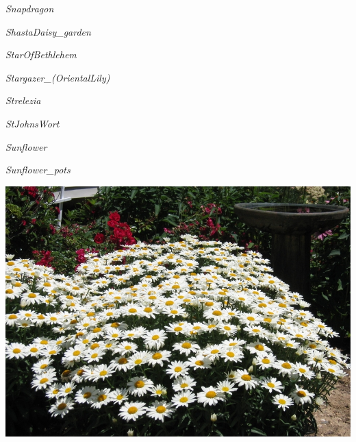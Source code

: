 \documentclass{article}
\begin{document}
\noindent   
\vfill
\centerline{{\Large\emph{Snapdragon}}}
\vfill
\newpage

\noindent   
\vfill
\centerline{{\Large\emph{ShastaDaisy_garden}}}
\vfill
\newpage

\noindent   
\vfill
\centerline{{\Large\emph{StarOfBethlehem}}}
\vfill
\newpage

\noindent   
\vfill
\centerline{{\Large\emph{Stargazer_(OrientalLily)}}}
\vfill
\newpage

\noindent   
\vfill
\centerline{{\Large\emph{Strelezia}}}
\vfill
\newpage

\noindent   
\vfill
\centerline{{\Large\emph{StJohnsWort}}}
\vfill
\newpage

\noindent   
\vfill
\centerline{{\Large\emph{Sunflower}}}
\vfill
\newpage

\noindent   
\vfill
\centerline{{\Large\emph{Sunflower_pots}}}
\vfill
\newpage

\begin{center}
\includegraphics[width=0.9\textheight, angle=90]{../ShastaDaisy_garden.jpg}
\end{center}
\newpage
\end{document}

